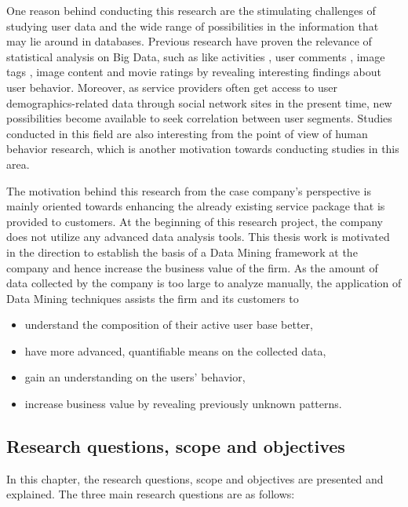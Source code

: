     One reason behind conducting this research are the stimulating challenges of studying user data and the wide range of possibilities in the information that may lie around in databases. Previous research have proven the relevance of statistical analysis on Big Data, such as like activities \cite{jang2015noreciprocity, jang2016teensengagemorewithfewerphotos, ottoni2013ladies, guy2016whatsyourorganizationlike, jang2015no, youyou2015computer}, user comments \cite{jang2016teensengagemorewithfewerphotos}, image tags \cite{jang2016teensengagemorewithfewerphotos}, image content \cite{hu2014we, bakhshi2014faces} and movie ratings \cite{saraee2004data, kabinsingha2012movie} by revealing interesting findings about user behavior. Moreover, as service providers often get access to user demographics-related data through social network sites in the present time, new possibilities become available to seek correlation between user segments. Studies conducted in this field are also interesting from the point of view of human behavior research, which is another motivation towards conducting studies in this area. 

    The motivation behind this research from the case company's perspective is mainly oriented towards enhancing the already existing service package that is provided to customers. At the beginning of this research project, the company does not utilize any advanced data analysis tools. This thesis work is motivated in the direction to establish the basis of a Data Mining framework at the company and hence increase the business value of the firm. As the amount of data collected by the company is too large to analyze manually, the application of Data Mining techniques assists the firm and its customers to 

    \begin{itemize}
        \item understand the composition of their active user base better,
        \item have more advanced, quantifiable means on the collected data,
        \item gain an understanding on the users' behavior, 
        \item increase business value by revealing previously unknown patterns.
    \end{itemize} 

\subsection{Research questions, scope and objectives}
In this chapter, the research questions, scope and objectives are presented and explained. The three main research questions are as follows:

